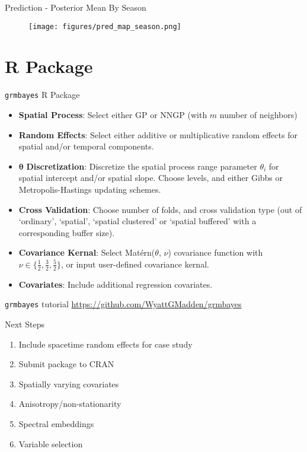 \documentclass{beamer}
\begin{document}
\begin{frame}{Prediction - Posterior Mean By Season}
\begin{figure}[h]
    \texttt{[image: figures/pred\_map\_season.png]}
    \vspace{-1cm}
\end{figure}

\end{frame}


\section{R Package}

\begin{frame}{\texttt{grmbayes} R Package}
    {\tiny
    \begin{itemize}
        \small
        \item \textbf{Spatial Process}: Select either GP or NNGP (with $m$ number of neighbors)
        \item \textbf{Random Effects}: Select either additive or multiplicative random effects for spatial and/or temporal components.
        \item $\pmb{\theta}$ \textbf{Discretization}: Discretize the spatial process range parameter $\theta_i$ for spatial intercept and/or spatial slope. Choose levels, and either Gibbs or Metropolis-Hastings updating schemes. 
        \item \textbf{Cross Validation}: Choose number of folds, and cross validation type (out of `ordinary', `spatial', `spatial clustered' or `spatial buffered' with a corresponding buffer size). 
        \item \textbf{Covariance Kernal}: Select Mat\'{e}rn($\theta$, $\nu$) covariance function with $\nu \in \{\frac{1}{2}, \frac{3}{2}, \frac{5}{2} \}$, or input user-defined covariance kernal.
        \item \textbf{Covariates}: Include additional regression covariates. 
    \end{itemize}
    }
\end{frame}

\begin{frame}{\texttt{grmbayes} tutorial}
    \url{https://github.com/WyattGMadden/grmbayes}
\end{frame}

\begin{frame}{Next Steps}   
    \begin{enumerate}
        \item Include spacetime random effects for case study 
        \item Submit package to CRAN
        \item Spatially varying covariates
        \item Anisotropy/non-stationarity 
        \item Spectral embeddings
        \item Variable selection
    \end{enumerate}

\end{frame}
\end{document}
